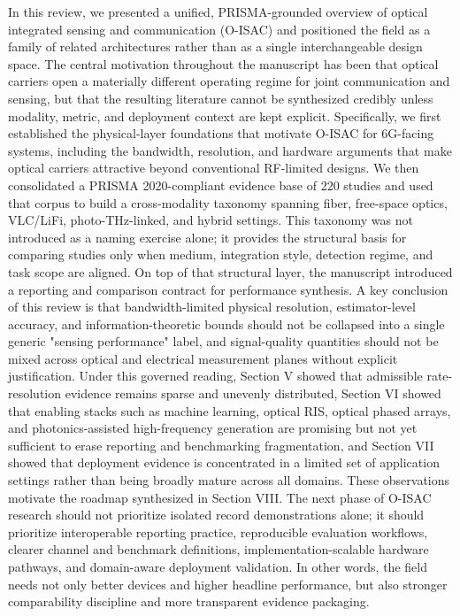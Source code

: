 {}
\markdownRendererSectionEnd 
\markdownRendererSectionEnd \markdownRendererSectionBegin
{}\markdownRendererInterblockSeparator
{}In this review, we presented a unified, PRISMA-grounded overview of optical integrated sensing and communication (O-ISAC) and positioned the field as a family of related architectures rather than as a single interchangeable design space. The central motivation throughout the manuscript has been that optical carriers open a materially different operating regime for joint communication and sensing, but that the resulting literature cannot be synthesized credibly unless modality, metric, and deployment context are kept explicit.\markdownRendererParagraphSeparator
{}Specifically, we first established the physical-layer foundations that motivate O-ISAC for 6G-facing systems, including the bandwidth, resolution, and hardware arguments that make optical carriers attractive beyond conventional RF-limited designs. We then consolidated a PRISMA 2020-compliant evidence base of 220 studies and used that corpus to build a cross-modality taxonomy spanning fiber, free-space optics, VLC/LiFi, photo-THz-linked, and hybrid settings. This taxonomy was not introduced as a naming exercise alone; it provides the structural basis for comparing studies only when medium, integration style, detection regime, and task scope are aligned.\markdownRendererParagraphSeparator
{}On top of that structural layer, the manuscript introduced a reporting and comparison contract for performance synthesis. A key conclusion of this review is that bandwidth-limited physical resolution, estimator-level accuracy, and information-theoretic bounds should not be collapsed into a single generic "sensing performance" label, and signal-quality quantities should not be mixed across optical and electrical measurement planes without explicit justification. Under this governed reading, Section V showed that admissible rate-resolution evidence remains sparse and unevenly distributed, Section VI showed that enabling stacks such as machine learning, optical RIS, optical phased arrays, and photonics-assisted high-frequency generation are promising but not yet sufficient to erase reporting and benchmarking fragmentation, and Section VII showed that deployment evidence is concentrated in a limited set of application settings rather than being broadly mature across all domains.\markdownRendererParagraphSeparator
{}These observations motivate the roadmap synthesized in Section VIII. The next phase of O-ISAC research should not prioritize isolated record demonstrations alone; it should prioritize interoperable reporting practice, reproducible evaluation workflows, clearer channel and benchmark definitions, implementation-scalable hardware pathways, and domain-aware deployment validation. In other words, the field needs not only better devices and higher headline performance, but also stronger comparability discipline and more transparent evidence packaging.\markdownRendererParagraphSeparator
